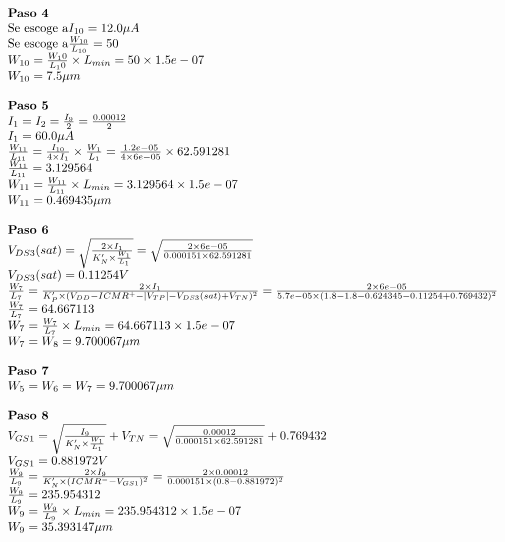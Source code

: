 \begin{equation*}
	\begin{array}{l l}
		\textbf{Paso 4} \\
		\text{Se escoge a} I_{10} =  12.0  \mu A \\
		\text{Se escoge a} \frac{W_{10}}{L_{10}} =  50  \\
		W_{10} = \frac{W_10}{L_10} \times L_{min} =  50 \times 1.5e-07  \\
		W_{10} =  7.5  \mu m \\
		\\
		\textbf{Paso 5} \\
		I_{1} = I_{2} = \frac{I_{9}}{2} = \frac{ 0.00012 }{2} \\
		I_{1} =  60.0 \mu A \\
		\frac{W_{11}}{L_{11}} = \frac{I_{10}}{4\times I_{1}}\times \frac{W_1}{L_1}= \frac{ 1.2e-05 }{4\times 6e-05 }\times 62.591281  \\
		\frac{W_{11}}{L_{11}} =  3.129564  \\
		W_{11} = \frac{W_{11}}{L_{11}} \times L_{min} =  3.129564 \times 1.5e-07  \\
		W_{11} =  0.469435  \mu m \\
		\\
		\textbf{Paso 6} \\
		V_{DS3}(sat) = \sqrt{\frac{2\times I_{1}}{K'_{N}\times\frac{W_{1}}{L_{1}}}} = \sqrt{\frac{2\times 6e-05 }{ 0.000151 \times 62.591281 }} \\
		V_{DS3}(sat) =  0.11254  V \\
		\frac{W_7}{L_7} = \frac{2\times I_{1}}{K'_{P}\times (V_{DD}-ICMR^{+}-|V_{TP}|-V_{DS3}(sat)+V_{TN})^{2}} = \frac{2\times 6e-05 }{ 5.7e-05 \times ( 1.8 - 1.8 - 0.624345 - 0.11254 + 0.769432 )^{2}} \\
		\frac{W_7}{L_7} =  64.667113  \\
		W_{7} = \frac{W_7}{L_7} \times L_{min} =  64.667113 \times 1.5e-07  \\
		W_{7} = W_{8} =  9.700067  \mu m \\
		\\
		\textbf{Paso 7} \\
		W_{5} = W_{6} = W_{7} =  9.700067  \mu m \\
		\\
		\textbf{Paso 8} \\
		V_{GS1} = \sqrt{\frac{I_{9}}{K'_{N}\times\frac{W_{1}}{L_{1}}}}+V_{TN} = \sqrt{\frac{ 0.00012 }{ 0.000151 \times 62.591281 }}+ 0.769432  \\
		V_{GS1} =  0.881972  V \\
		\frac{W_9}{L_9} = \frac{2\times I_{9}}{K'_{N}\times (ICMR^{-}-V_{{GS1}})^{2}} = \frac{2\times 0.00012 }{ 0.000151 \times ( 0.8 - 0.881972 )^{2}} \\
		\frac{W_9}{L_9} =  235.954312  \\
		W_{9} = \frac{W_9}{L_9} \times L_{min} =  235.954312 \times 1.5e-07  \\
		W_{9} =  35.393147  \mu m \\
	\end{array}
\end{equation*}

